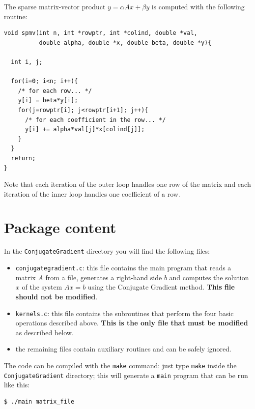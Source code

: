 \documentclass{article}
\begin{document}
\newpage

The sparse matrix-vector product $y = \alpha Ax + \beta y$ is computed
with the following routine: %
\small
\begin{verbatim}
void spmv(int n, int *rowptr, int *colind, double *val, 
          double alpha, double *x, double beta, double *y){

  int i, j;

  for(i=0; i<n; i++){
    /* for each row... */
    y[i] = beta*y[i];
    for(j=rowptr[i]; j<rowptr[i+1]; j++){
      /* for each coefficient in the row... */
      y[i] += alpha*val[j]*x[colind[j]];
    }
  }
  return;
}
\end{verbatim}
\normalsize

Note that each iteration of the outer loop handles one row of the
matrix and each iteration of the inner loop handles one coefficient of
a row.


\section{Package content}
In the \texttt{ConjugateGradient} directory you will find the
following files:
\begin{itemize}
\item \texttt{conjugategradient.c}: this file contains the main
  program that reads a matrix $A$ from a file, generates a right-hand
  side $b$ and computes the solution $x$ of the system $Ax=b$ using
  the Conjugate Gradient method. {\bf This file should not be
    modified}.
\item \texttt{kernels.c}: this file contains the subroutines that
  perform the four basic operations described above. {\bf This is the
    only file that must be modified} as described below.
\item the remaining files contain auxiliary routines and can be safely
  ignored.
\end{itemize}

The code can be compiled with the \texttt{make} command: just type
\texttt{make} inside the \texttt{ConjugateGradient} directory; this
will generate a \texttt{main} program that can be run like this:

\begin{verbatim}
$ ./main matrix_file
\end{verbatim}
\end{document}
